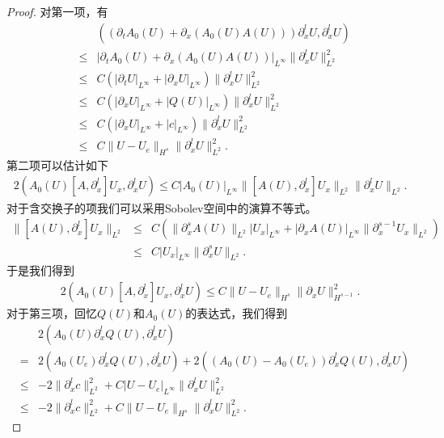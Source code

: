 \begin{proof}
对第一项，有
\begin{eqnarray}\label{HsEST:1}
  && ((\partial_t A_0(U) + \partial_x (A_0(U)A(U)))\partial^l_x U, \partial^l_x U) \nonumber\\
  &\le&|\partial_t A_0(U) + \partial_x (A_0(U)A(U))|_{L^\infty}\|\partial^l_x U\|_{L^2}^2 \nonumber\\
  &\le& C (|\partial_t U|_{L^\infty}+|\partial_x U|_{L^{\infty}})\|\partial^l_x U\|_{L^2}^2  \\
  &\le& C (|\partial_x U|_{L^\infty}+|Q(U)|_{L^\infty})\|\partial^l_x U\|_{L^2}^2\nonumber\\
  &\le& C (|\partial_x U|_{L^\infty} + |c|_{L^\infty}) \|\partial^l_x U\|_{L^2}^2\nonumber \\
  &\le& C \|U-U_e\|_{H^s} \|\partial^l_x U\|_{L^2}^2. \nonumber
\end{eqnarray}
第二项可以估计如下
\begin{eqnarray*}
  2(A_0(U) [A,\partial^l_x] U_x, \partial^l_x U) \le C |A_0(U)|_{L^\infty} \|[A(U),\partial^l_x] U_x\|_{L^2} \|\partial^l_x U\|_{L^2}.
\end{eqnarray*}
对于含交换子的项我们可以采用Sobolev空间中的演算不等式\cite{majda1984compressible}。
\begin{eqnarray*}
  \|[A(U),\partial^l_x] U_x\|_{L^2} &\le& C (\|\partial_x^s A(U)\|_{L^2}|U_x|_{L^\infty} + |\partial_x A(U)|_{L^{\infty}} \|\partial_x^{s-1} U_x\|_{L^2})  \\
  &\le& C|U_x|_{L^\infty} \|\partial_x^s U\|_{L^2}.
\end{eqnarray*}
于是我们得到
\begin{eqnarray}\label{HsEST:2}
  2(A_0(U) [A,\partial_x^l] U_x,\partial^l_x U) \le C \|U-U_e\|_{H^s}\|\partial_x U\|_{H^{s-1}}^2.
\end{eqnarray}
对于第三项，回忆$Q(U)$和$A_0(U)$的表达式，我们得到
\begin{eqnarray}\label{HsEST:3}
&& 2(A_0(U)\partial^l_x Q(U),\partial^l_x U) \nonumber \\
&=& 2( A_0(U_e)\partial^l_x Q(U),\partial^l_x U) + 2((A_0(U)-A_0(U_e)) \partial^l_x Q(U),\partial^l_x U) \nonumber \\
&\le&  -2 \|\partial^l_x c\|_{L^2}^2 + C|U-U_e|_{L^\infty} \|\partial^l_x U\|_{L^2}^2 \nonumber \\
&\le& -2 \|\partial^l_x c\|_{L^2}^2 + C\|U-U_e\|_{H^s} \|\partial^l_x U\|_{L^2}^2.
\end{eqnarray}


\end{proof}

